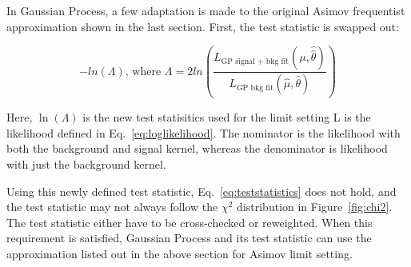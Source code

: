 In Gaussian Process, a few adaptation is made to the original Asimov frequentist approximation shown in the last section. First, the test statistic is swapped out:

\begin{equation}
    -ln(\Lambda) \textrm{, where }\Lambda= 2ln(\frac{L_{\textrm{GP signal + bkg fit}}(\mu, \hat{\hat{\theta}})}{L_{\textrm{GP bkg fit}}(\hat{\mu}, \hat{\theta})})
\end{equation}

Here, $\ln(\Lambda)$ is the new test statisitics used for the limit setting L is the likelihood defined in Eq.~\ref{eq:loglikelihood}. The nominator is the likelihood with both the background and signal kernel, whereas the denominator is likelihood with just the background kernel. 

Using this newly defined test statistic, Eq.~\ref{eq:teststatistics} does not hold, and the test statistic may not always follow the $\chi^{2}$ distribution in Figure~\ref{fig:chi2}. The test statistic either have to be cross-checked or reweighted. When this requirement is satisfied, Gaussian Process and its test statistic can use the approximation listed out in the above section for Asimov limit setting.




